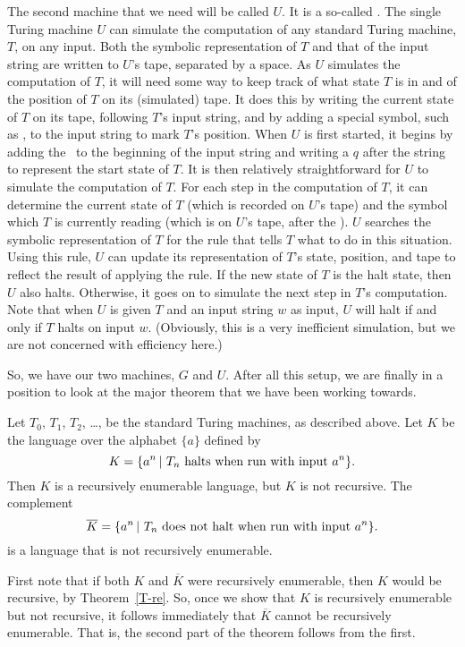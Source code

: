 The second machine that we need will be called $U$.  It is a
so-called .  The single Turing machine
$U$ can simulate the computation of any standard Turing machine, $T$,
on any input.  Both the symbolic representation of $T$ and that of
the input string are written to $U$'s tape, separated by a
space.  As $U$ simulates the computation of $T$, it will need
some way to keep track of what state $T$ is in and of
the position of $T$ on its (simulated) tape.  It does this
by writing the current state of $T$ on its tape, following
$T$'s input string, and by adding a special symbol, such as \at,
to the input string to mark $T$'s position.  When $U$ is first
started, it begins by adding the \at\ to the beginning of the
input string and writing a $q$ after the string to represent
the start state of $T$.  It is then relatively straightforward
for $U$ to simulate the computation of $T$.  For each step
in the computation of $T$, it can determine the current state
of $T$ (which is recorded on $U$'s tape) and the symbol which
$T$ is currently reading (which is on $U$'s tape, after the \at).
$U$ searches the symbolic representation of $T$ for the
rule that tells $T$ what to do in this situation.  Using
this rule, $U$ can update its representation of $T$'s state,
position, and tape to reflect the result of applying the rule.
If the new state of $T$ is the halt state, then $U$ also halts.
Otherwise, it goes on to simulate the next step in $T$'s computation.
Note that when $U$ is given $T$ and an input string $w$ as
input, $U$ will halt if and only if $T$ halts on input $w$.
(Obviously, this is a very inefficient simulation, but we
are not concerned with efficiency here.)

So, we have our two machines, $G$ and $U$.
After all this setup, we are finally in a position to look at
the major theorem that we have been working towards.

\begin{theorem}
Let $T_0$, $T_1$, $T_2$, \dots, be the standard Turing machines,
as described above.  Let $K$ be the language over the alphabet $\{a\}$
defined by $$K=\{a^n\,|\,\,T_n\text{ halts when run with input }a^n\}.$$
Then $K$ is a recursively enumerable language, but $K$ is not
recursive.  The complement $$\overline{K}=\{a^n\,|\,\,T_n\text{ does
not halt when run with input }a^n\}.$$
is a language that is not recursively enumerable.
\end{theorem}

First note that if both $K$ and $\overline{K}$ were recursively
enumerable, then $K$ would be recursive, by Theorem~\ref{T-re}.
So, once we show that $K$ is recursively enumerable but not
recursive, it follows immediately that $\overline{K}$ cannot
be recursively enumerable.  That is, the second part of the
theorem follows from the first.

